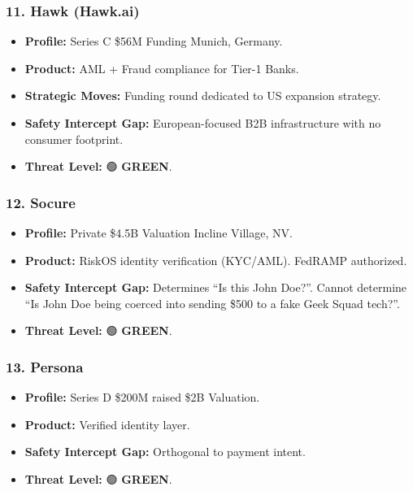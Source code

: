 \documentclass[
]{article}
\providecommand{\tightlist}{%
  \setlength{\itemsep}{0pt}\setlength{\parskip}{0pt}}
\begin{document}
\subsubsection{11. Hawk (Hawk.ai)}\label{hawk-hawk.ai}

\begin{itemize}
\tightlist
\item
  \textbf{Profile:} Series C \textbar{} \$56M Funding \textbar{} Munich,
  Germany.
\item
  \textbf{Product:} AML + Fraud compliance for Tier-1 Banks.
\item
  \textbf{Strategic Moves:} Funding round dedicated to US expansion
  strategy.
\item
  \textbf{Safety Intercept Gap:} European-focused B2B infrastructure
  with no consumer footprint.
\item
  \textbf{Threat Level:} 🟢 \textbf{GREEN}.
\end{itemize}

\subsubsection{12. Socure}\label{socure}

\begin{itemize}
\tightlist
\item
  \textbf{Profile:} Private \textbar{} \$4.5B Valuation \textbar{}
  Incline Village, NV.
\item
  \textbf{Product:} RiskOS identity verification (KYC/AML). FedRAMP
  authorized.
\item
  \textbf{Safety Intercept Gap:} Determines ``Is this John Doe?''.
  Cannot determine ``Is John Doe being coerced into sending \$500 to a
  fake Geek Squad tech?''.
\item
  \textbf{Threat Level:} 🟢 \textbf{GREEN}.
\end{itemize}

\subsubsection{13. Persona}\label{persona}

\begin{itemize}
\tightlist
\item
  \textbf{Profile:} Series D \textbar{} \$200M raised \textbar{} \$2B
  Valuation.
\item
  \textbf{Product:} Verified identity layer.
\item
  \textbf{Safety Intercept Gap:} Orthogonal to payment intent.
\item
  \textbf{Threat Level:} 🟢 \textbf{GREEN}.
\end{itemize}
\end{document}
